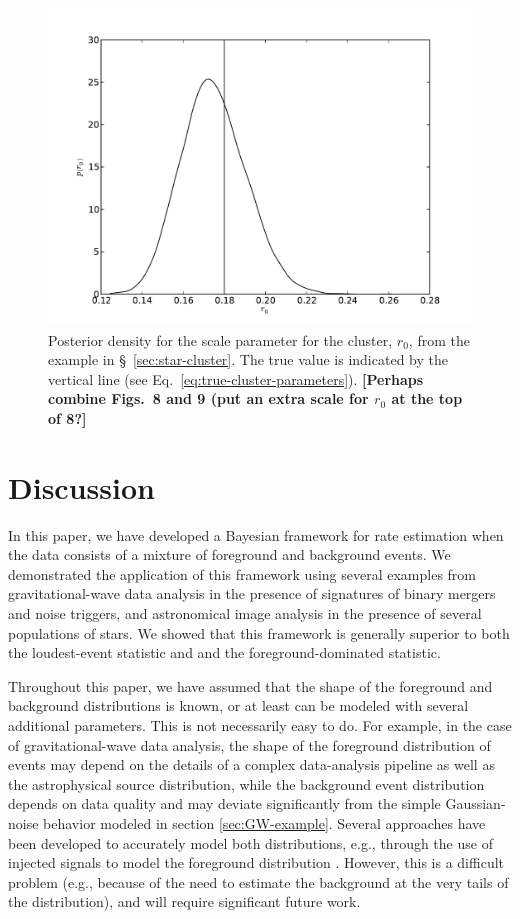 \documentclass[aps,prd]{revtex4-1}
\newcommand{\ilya}[1]{{\color{red} \bf #1}}
\begin{document}
\begin{figure}
  \includegraphics[width=\columnwidth]{scale}
  \caption{\label{fig:cluster-scale} Posterior density for the scale
    parameter for the cluster, $r_0$, from the example in
    \S~\ref{sec:star-cluster}.  The true value is indicated by the
    vertical line (see Eq.~\ref{eq:true-cluster-parameters}).
    \ilya{[Perhaps combine Figs.~8 and 9 (put an extra scale for $r_0$
        at the top of 8?]} }
\end{figure}

\section{Discussion}\label{sec:discussion}

In this paper, we have developed a Bayesian framework for rate
estimation when the data consists of a mixture of foreground and
background events.  We demonstrated the application of this framework
using several examples from gravitational-wave data analysis in the
presence of signatures of binary mergers and noise triggers, and
astronomical image analysis in the presence of several populations of
stars.  We showed that this framework is generally superior to both
the loudest-event statistic and and the foreground-dominated
statistic.

Throughout this paper, we have assumed that the shape of the
foreground and background distributions is known, or at least can be
modeled with several additional parameters.  This is not necessarily
easy to do.  For example, in the case of gravitational-wave data
analysis, the shape of the foreground distribution of events may
depend on the details of a complex data-analysis pipeline as well as
the astrophysical source distribution, while the background event
distribution depends on data quality and may deviate significantly
from the simple Gaussian-noise behavior modeled in section
\ref{sec:GW-example}.  Several approaches have been developed to
accurately model both distributions, e.g., through the use of injected
signals to model the foreground distribution \cite{ihope,CannonHannaKeppel:2012}.
However, this is a difficult problem (e.g., because of the need to
estimate the background at the very tails of the distribution), and
will require significant future work.
\end{document}
